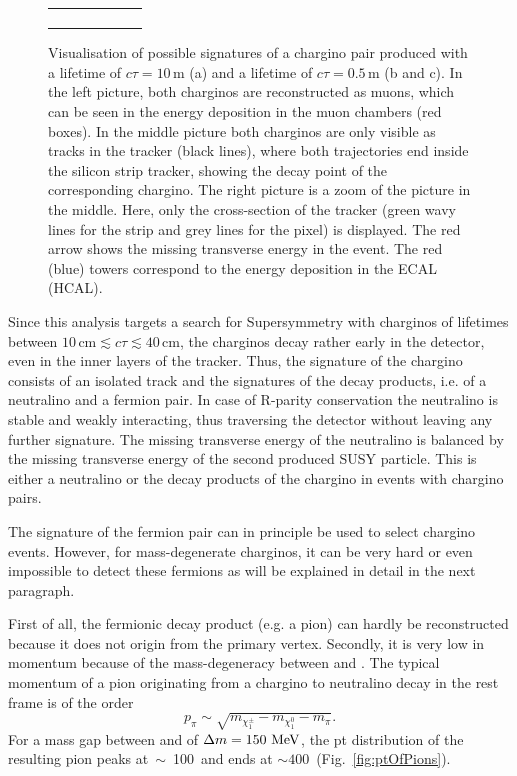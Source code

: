 \begin{figure}[!t]
\begin{tabular}{c}
\begin{subfigure}{0.31\textwidth}
      \caption{}
  \end{subfigure} 
  \end{tabular}
  \caption{Visualisation of possible signatures of a chargino pair produced with a lifetime of $c\tau = 10\,\text{m}$ (a) and a lifetime of $c\tau = 0.5\,\text{m}$ (b and c). 
           In the left picture, both charginos are reconstructed as muons, which can be seen in the energy deposition in the muon chambers (red boxes). 
           In the middle picture both charginos are only visible as tracks in the tracker (black lines), where both trajectories end inside the silicon strip tracker, showing the decay point of the corresponding chargino. 
           The right picture is a zoom of the picture in the middle. Here, only the cross-section of the tracker (green wavy lines for the strip and grey lines for the pixel) is displayed. The red arrow shows the missing transverse energy in the event.
           The red (blue) towers correspond to the energy deposition in the ECAL (HCAL).} 
  \label{fig:CharginoPaiEventDisplay}
\end{figure}

Since this analysis targets a search for Supersymmetry with charginos of lifetimes between $10\,\text{cm} \lesssim c\tau \lesssim  40\,\text{cm}$, the charginos decay rather early in the detector, even in the inner layers of the tracker. 
Thus, the signature of the chargino consists of an isolated track and the signatures of the decay products, i.e. of a neutralino and a fermion pair. 
In case of R-parity conservation the neutralino is stable and weakly interacting, thus traversing the detector without leaving any further signature.
The missing transverse energy of the neutralino is balanced by the missing transverse energy of the second produced SUSY particle.
This is either a neutralino or the decay products of the chargino in events with chargino pairs. 

The signature of the fermion pair can in principle be used to select chargino events. 
However, for mass-degenerate charginos, it can be very hard or even impossible to detect these fermions as will be explained in detail in the next paragraph.

First of all, the fermionic decay product (e.g. a pion) can hardly be reconstructed because it does not origin from the primary vertex.
Secondly, it is very low in momentum because of the mass-degeneracy between \chipm and \chiO.
The typical momentum of a pion originating from a chargino to neutralino decay in the \chipm rest frame is of the order 
\begin{equation*}
p_{\pi}\sim \sqrt{m_{\chi^{\pm}_1}-m_{\chi^{0}_1}-m_{\pi}}.
\end{equation*}
For a mass gap between \chipm and \chiO of $\Delta m=150\, \,\text{Me}\kern-0.06667em\text{V}$, the pt distribution of the resulting pion peaks \mbox{at $\sim$ 100\,\mev} and ends at \mbox{\pt $\sim 400\,$\mev} (Fig.~\ref{fig:ptOfPions}).

